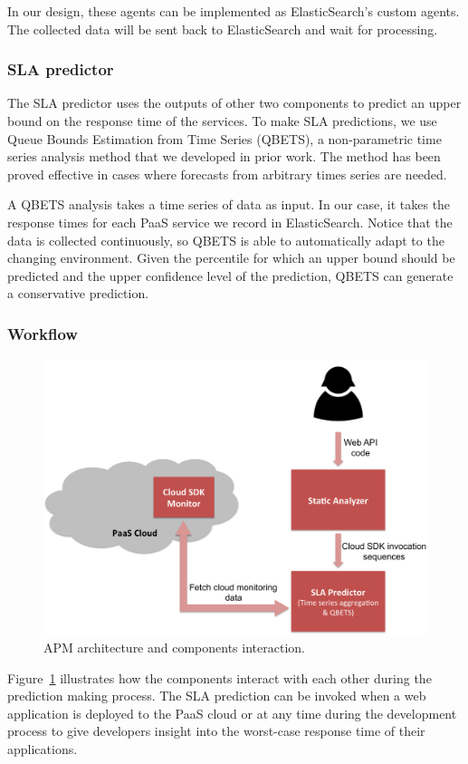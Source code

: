 \documentclass[11pt]{article}
\begin{document}
In our design, these agents can be implemented as ElasticSearch's custom agents. The collected data will be sent back to ElasticSearch
and wait for processing.

\subsubsection{SLA predictor}
The SLA predictor uses the outputs of other two components to predict an upper bound on the response time of the services.
To make SLA predictions, we use Queue Bounds Estimation from Time Series (QBETS), a non-parametric time series analysis method that
we developed in prior work. The method has been proved effective in cases where forecasts from arbitrary times series are needed.

A QBETS analysis takes a time series of data as input. In our case, it takes the response times for each PaaS service we record in ElasticSearch.
Notice that the data is collected continuously, so QBETS is able to automatically adapt to the changing environment. Given the percentile for which 
an upper bound should be predicted and the upper confidence level of the prediction, QBETS can generate a conservative prediction.

\subsubsection{Workflow}
\begin{figure}
\centering
\includegraphics[scale=0.5]{apm_flow}
\caption{APM architecture and components interaction.}
\label{fig:apm_flow}
\end{figure}
Figure~\ref{fig:apm_flow} illustrates how the components interact with each other during the prediction making process.
The SLA prediction can be invoked when a web application is deployed to the PaaS cloud or at any time during the development process to give
developers insight into the worst-case response time of their applications.
\end{document}
